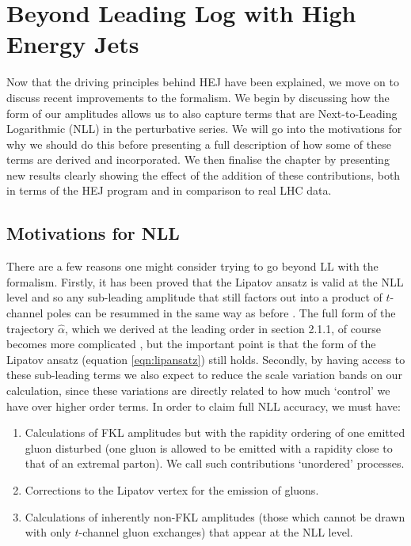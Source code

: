 \chapter{Beyond Leading Log with High Energy Jets}

Now that the driving principles behind HEJ have been explained, we move on to discuss recent improvements to the formalism. We begin by discussing how the form of our amplitudes allows us to also capture terms that are Next-to-Leading Logarithmic (NLL) in the perturbative series. We will go into the motivations for why we should do this before presenting a full description of how some of these terms are derived and incorporated. We then finalise the chapter by presenting new results clearly showing the effect of the addition of these contributions, both in terms of the HEJ program and in comparison to real LHC data. 

\section{Motivations for NLL}

There are a few reasons one might consider trying to go beyond LL with the formalism. Firstly, it has been proved that the Lipatov ansatz is valid at the NLL level and so any sub-leading amplitude that still factors out into a product of $t$-channel poles can be resummed in the same way as before \cite{Fadin2006}. The full form of the trajectory $\hat{\alpha}$, which we derived at the leading order in section 2.1.1, of course becomes more complicated \cite{Fadin2003}, but the important point is that the form of the Lipatov ansatz (equation \ref{eqn:lipansatz}) still holds. Secondly, by having access to these sub-leading terms we also expect to reduce the scale variation bands on our calculation, since these variations are directly related to how much `control' we have over higher order terms. In order to claim full NLL accuracy, we must have:

\begin{enumerate}
\item{Calculations of FKL amplitudes but with the rapidity ordering of one emitted gluon disturbed (one gluon is allowed to be emitted with a rapidity close to that of an extremal parton). We call such contributions `unordered' processes.}
\item{Corrections to the Lipatov vertex for the emission of gluons.}
\item{Calculations of inherently non-FKL amplitudes (those which cannot be drawn with only $t$-channel gluon exchanges) that appear at the NLL level.}
\end{enumerate}

